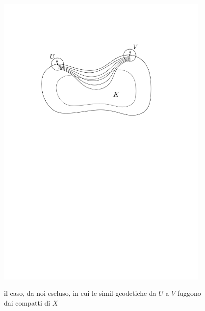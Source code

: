 \begin{figure}[h!]
    \begin{center}
        \includegraphics[width=0.935\textwidth, trim=0 18cm 0 5cm]{Immagini/nonvis.png} \\
        \caption{il caso, da noi escluso, in cui le simil-geodetiche da $U$ a $V$ fuggono dai compatti di $X$}
    \end{center}
\end{figure}

